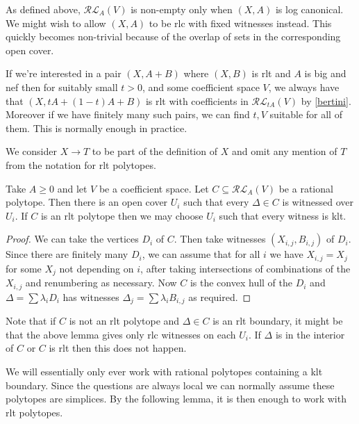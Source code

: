 	
	\begin{remark}
		
		As defined above, $\mathcal{RL}_{A}(V)$ is non-empty only when $(X,A)$ is log canonical. We might wish to allow $(X,A)$ to be rlc with fixed witnesses instead. This quickly becomes non-trivial because of the overlap of sets in the corresponding open cover.
		
		If we're interested in a pair $(X,A+B)$ where $(X,B)$ is rlt and $A$ is big and nef then for suitably small $t>0$, and some coefficient space $V$, we always have that $(X,tA+(1-t)A+B)$ is rlt with coefficients in $\mathcal{RL}_{tA}(V)$ by \autoref{bertini}. Moreover if we have finitely many such pairs, we can find $t,V$ suitable for all of them. This is normally enough in practice.
		
	\end{remark}

	We consider $X \to T$ to be part of the definition of $X$ and omit any mention of $T$ from the notation for rlt polytopes.
	
	\begin{lemma}
		Take $A \geq 0$ and let $V$ be a coefficient space. Let $C \subseteq \mathcal{RL}_{A}(V)$ be a rational polytope. Then there is an open cover $U_{i}$ such that every $\Delta \in C$ is witnessed over $U_{i}$. If $C$ is an rlt polytope then we may choose $U_{i}$ such that every witness is klt.
	\end{lemma}
	\begin{proof}
		We can take the vertices $D_{i}$ of $C$. Then take witnesses $(X_{i,j}, B_{i,j})$ of $D_{i}$. Since there are finitely many $D_{i}$, we can assume that for all $i$ we have $X_{i,j}=X_{j}$ for some $X_{j}$ not depending on $i$, after taking intersections of combinations of the $X_{i,j}$ and renumbering as necessary. Now $C$ is the convex hull of the $D_{i}$ and $\Delta= \sum \lambda_{i}D_{i}$ has witnesses $\Delta_{j}= \sum \lambda_{i}B_{i,j}$ as required.
	\end{proof}

	Note that if $C$ is not an rlt polytope and $\Delta \in C$ is an rlt boundary, it might be that the above lemma gives only rlc witnesses on each $U_{i}$. If $\Delta$ is in the interior of $C$ or $C$ is rlt then this does not happen.
	
	We will essentially only ever work with rational polytopes containing a klt boundary. Since the questions are always local we can normally assume these polytopes are simplices. By the following lemma, it is then enough to work with rlt polytopes.
	
